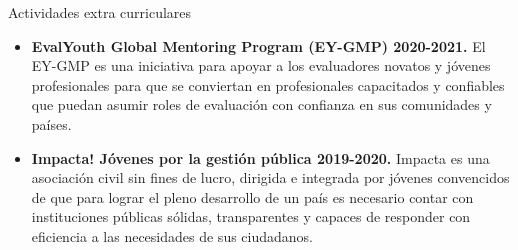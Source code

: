 \documentclass{resume} %
\begin{document}
\begin{rSection}{Actividades extra curriculares} 
\begin{itemize}
    \item 	\textbf{EvalYouth Global Mentoring Program (EY-GMP) 2020-2021.} {El EY-GMP es una iniciativa para apoyar a los evaluadores novatos y jóvenes profesionales para que se conviertan en profesionales capacitados y confiables que puedan asumir roles de evaluación con confianza en sus comunidades y países.}
  \item 	\textbf{Impacta! Jóvenes por la gestión pública 2019-2020.} {Impacta es una asociación civil sin fines de lucro, dirigida e integrada por jóvenes convencidos de que para lograr el pleno desarrollo de un país es necesario contar con instituciones públicas sólidas, transparentes y capaces de responder con eficiencia a las necesidades de sus ciudadanos.}
  \end{itemize}


\end{rSection}


   
\end{document}
